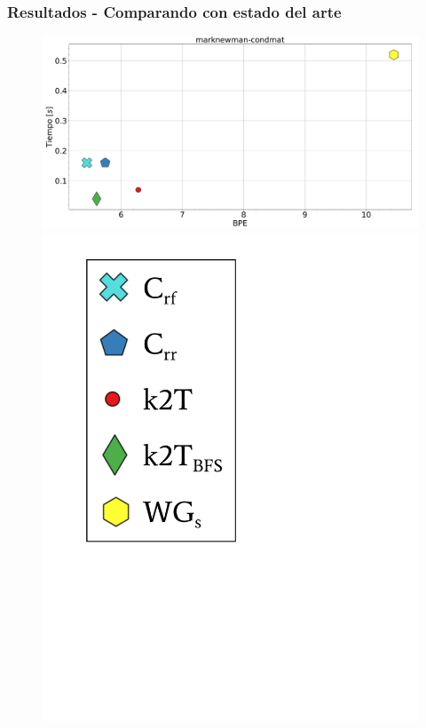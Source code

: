 \begin{frame}
\frametitle{Resultados - Comparando con estado del arte}

\begin{figure}
	\centering
	
    	\begin{minipage}{1\textwidth}
    		\centering
    		\begin{minipage}{0.8\textwidth}
    			\centering
    			\includegraphics[width=1\linewidth]{../img/bpeTimes/secuencial/marknewman-condmat.pdf}
    		\end{minipage}
    		\begin{minipage}{0.15\textwidth}
    			\centering
    			\includegraphics[scale=.16, clip, trim=70 200 280 40]{../img/bpeTimes/labelSec.pdf}
    		\end{minipage}	
    	\end{minipage}


\end{figure}
\end{frame}
